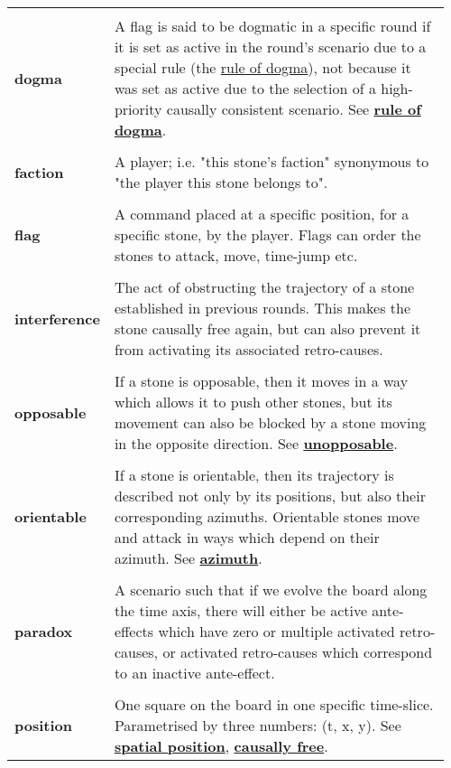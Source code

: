 {\begin{longtable}{ R{0.15\linewidth}  L{0.81\linewidth}  }
 \\* \textbf{dogma} & \parbox[t]{\linewidth}{A flag is said to be dogmatic in a specific round if it is set as active in the round's scenario due to a special rule (the \hyperref[sec:rule of dogma]{rule of dogma}), not because it was set as active due to the selection of a high-priority causally consistent scenario. See \hyperref[glossary:rule of dogma]{\textbf{rule of dogma}}.}\\
 \\* \textbf{faction} & \parbox[t]{\linewidth}{A player; i.e. "this stone's faction" synonymous to "the player this stone belongs to".}\\
 \\* \textbf{flag} & \parbox[t]{\linewidth}{A command placed at a specific position, for a specific stone, by the player. Flags can order the stones to attack, move, time-jump etc.}\\
 \\* \textbf{interference} & \parbox[t]{\linewidth}{The act of obstructing the trajectory of a stone established in previous rounds. This makes the stone causally free again, but can also prevent it from activating its associated retro-causes.}\\
 \\* \textbf{opposable} & \parbox[t]{\linewidth}{If a stone is opposable, then it moves in a way which allows it to push other stones, but its movement can also be blocked by a stone moving in the opposite direction. See \hyperref[glossary:unopposable]{\textbf{unopposable}}.}\\
 \\* \textbf{orientable} & \parbox[t]{\linewidth}{If a stone is orientable, then its trajectory is described not only by its positions, but also their corresponding azimuths. Orientable stones move and attack in ways which depend on their azimuth. See \hyperref[glossary:azimuth]{\textbf{azimuth}}.}\\
 \\* \textbf{paradox} & \parbox[t]{\linewidth}{A scenario such that if we evolve the board along the time axis, there will either be active ante-effects which have zero or multiple activated retro-causes, or activated retro-causes which correspond to an inactive ante-effect.}\\
 \\* \textbf{position} & \parbox[t]{\linewidth}{One square on the board in one specific time-slice. Parametrised by three numbers: (t, x, y). See \hyperref[glossary:spatial position]{\textbf{spatial position}}, \hyperref[glossary:causally free]{\textbf{causally free}}.}\\

\end{longtable}}
